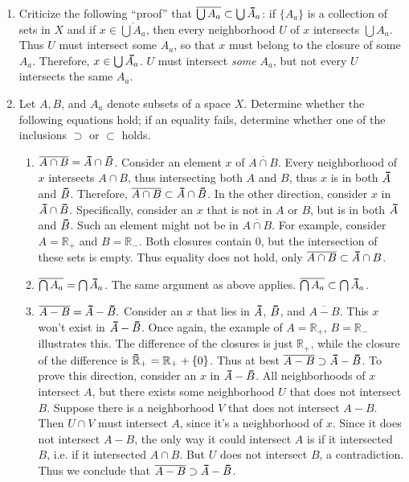 \documentclass[12pt,letterpaper]{article}
\newcommand{\n}{\break}
\newcommand\thickbar[1]{\accentset{\rule{.4em}{.8pt}}{#1}}
\let\bar\thickbar
\begin{document}
\begin{enumerate}
\begin{enumerate}
  \end{enumerate}
  \item Criticize the following ``proof'' that $\overline{\bigcup A_a} \subset \bigcup \bar{A}_a$: if $\{A_a\}$ is a collection of sets in $X$ and if $x\in\overline{\bigcup A_a}$, then every neighborhood $U$ of $x$ intersects $\bigcup A_a$. Thus $U$ must intersect some $A_a$, so that $x$ must belong to the closure of some $A_a$. Therefore, $x\in\bigcup\bar{A_a}$.\n
  \indent $U$ must intersect \emph{some} $A_a$, but not every $U$ intersects the same $A_a$. 
  \item Let $A, B$, and $A_a$ denote subsets of a space $X$. Determine whether the following equations hold; if an equality fails, determine whether one of the inclusions $\supset$ or $\subset$ holds.
  \begin{enumerate}
    \item $\overline{A\cap B} = \bar{A}\cap\bar{B}$.\hspace{5in}\n
    \indent Consider an element $x$ of $\overline{A \cap B}$. Every neighborhood of $x$ intersects $A\cap B$, thus intersecting both $A$ and $B$, thus $x$ is in both $\bar{A}$ and $\bar{B}$. Therefore, $\overline{A\cap B}\subset \bar{A}\cap\bar{B}$. In the other direction, consider $x$ in $\bar{A}\cap\bar{B}$. Specifically, consider an $x$ that is not in $A$ or $B$, but is in both $\bar{A}$ and $\bar{B}$. Such an element might not be in $\overline{A\cap B}$. For example, consider $A=\mathbb{R}_+$ and $B=\mathbb{R}_-$. Both closures contain $0$, but the intersection of these sets is empty. Thus equality does not hold, only $\overline{A\cap B}\subset \bar{A}\cap{B}$.
    \item $\overline{\bigcap A_a} = \bigcap\bar{A}_a$.\hspace{5in}\n
    \indent The same argument as above applies. $\overline{\bigcap A_a}\subset\bigcap\bar{A}_a$.
    \item $\overline{A-B}=\bar{A}-\bar{B}.$ \hspace{5in}\n
    \indent Consider an $x$ that lies in $\bar{A}$, $\bar{B}$, and $\overline{A-B}$. This $x$ won't exist in $\bar{A}-\bar{B}$. Once again, the example of $A=\mathbb{R}_+$, $B=\mathbb{R}_-$ illustrates this. The difference of the closures is just $\mathbb{R}_+$, while the closure of the difference is $\bar{\mathbb{R}}_+=\mathbb{R}_+ + \{0\}$. Thus at best $\overline{A-B}\supset\bar{A}-\bar{B}$. To prove this direction, consider an $x$ in $\bar{A}-\bar{B}$. All neighborhoods of $x$ intersect $A$, but there exists some neighborhood $U$ that does not intersect $B$. Suppose there is a neighborhood $V$ that does not intersect $A-B$. Then $U\cap V$ must intersect $A$, since it's a neighborhood of $x$. Since it does not intersect $A-B$, the only way it could intersect $A$ is if it intersected $B$, i.e. if it intersected $A\cap B$. But $U$ does not intersect $B$, a contradiction. Thus we conclude that $\overline{A-B}\supset\bar{A}-\bar{B}$.

\end{enumerate}
\end{enumerate}
\end{document}

